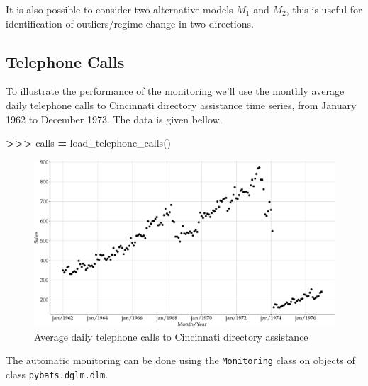 \documentclass[
]{article}
\newenvironment{Shaded}{\begin{snugshade}}{\end{snugshade}}
\newcommand{\NormalTok}[1]{#1}
\newcommand{\OperatorTok}[1]{\textcolor[rgb]{0.81,0.36,0.00}{\textbf{#1}}}
\begin{document}
It is also possible to consider two alternative models \(M_1\) and
\(M_2\), this is useful for identification of outliers/regime change in
two directions.

\hypertarget{telephone-calls}{%
\subsection{Telephone Calls}\label{telephone-calls}}

To illustrate the performance of the monitoring we'll use the monthly
average daily telephone calls to Cincinnati directory assistance time
series, from January 1962 to December 1973. The data is given bellow.

\begin{Shaded}
\begin{Highlighting}[]
\OperatorTok{\textgreater{}\textgreater{}\textgreater{}}\NormalTok{ calls }\OperatorTok{=}\NormalTok{ load\_telephone\_calls()}
\end{Highlighting}
\end{Shaded}

\begin{figure}

{\centering \includegraphics[width=0.9\linewidth]{pybats_detection_files/figure-latex/plot-calls-1} 

}

\caption{Average daily telephone calls to Cincinnati directory assistance}\label{fig:plot-calls}
\end{figure}

The automatic monitoring can be done using the \texttt{Monitoring} class
on objects of class \texttt{pybats.dglm.dlm}.
\end{document}
